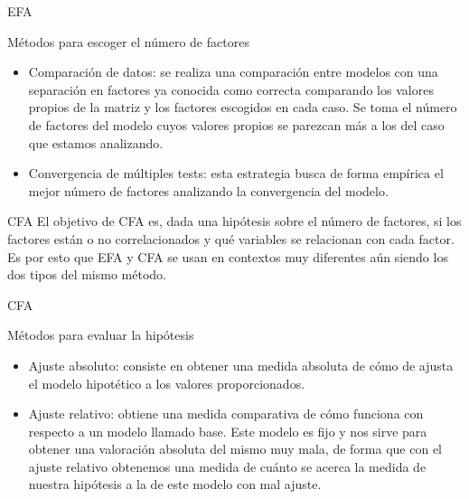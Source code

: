 \documentclass[10pt]{beamer}
\begin{document}
\begin{frame}[fragile]{EFA}
\vspace{10px}
\pause
{}
\begin{block}{Métodos para escoger el número de factores}
	\begin{itemize}
		\item Comparación de datos: se realiza una comparación entre modelos con una separación en factores ya conocida como correcta comparando los valores propios de la matriz y los factores escogidos en cada caso. Se toma el número de factores del modelo cuyos valores propios se parezcan más a los del caso que estamos analizando.
		\item Convergencia de múltiples tests: esta estrategia busca de forma empírica el mejor número de factores analizando la convergencia del modelo.
	\end{itemize}
\end{block}
\end{frame}

\begin{frame}[fragile]{CFA}
	El objetivo de CFA es, dada una hipótesis sobre el número de factores, si los factores están o no correlacionados y qué variables se relacionan con cada factor. Es por esto que EFA y CFA se usan en contextos muy diferentes aún siendo los dos tipos del mismo método.
\end{frame}

\begin{frame}[fragile]{CFA}
\vspace{10px}
\pause
{}
\begin{block}{Métodos para evaluar la hipótesis}
	\begin{itemize}
		\item Ajuste absoluto: consiste en obtener una medida absoluta de cómo de ajusta el modelo hipotético a los valores proporcionados.
		\item Ajuste relativo: obtiene una medida comparativa de cómo funciona con respecto a un modelo llamado base. Este modelo es fijo y nos sirve para obtener una valoración absoluta del mismo muy mala, de forma que con el ajuste relativo obtenemos una medida de cuánto se acerca la medida de nuestra hipótesis a la de este modelo con mal ajuste.
	\end{itemize}
\end{block}
\end{frame}
\end{document}
